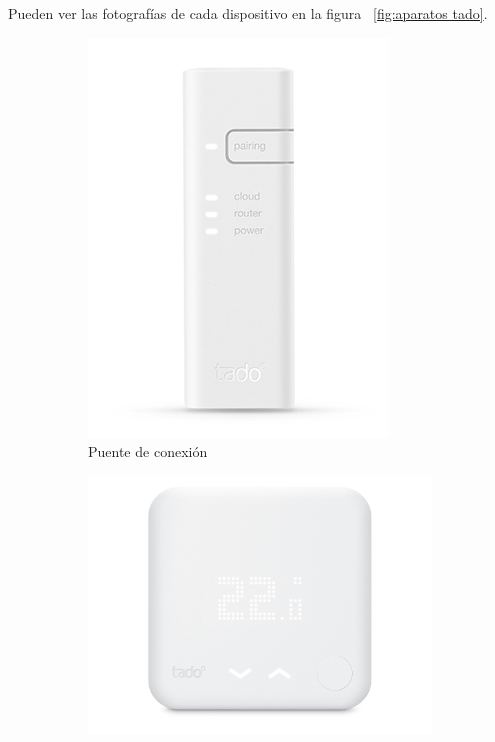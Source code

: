 \documentclass[spanish,12pt, a4paper, twoside]{paper}
\begin{document}
Pueden ver las fotografías de cada dispositivo en la figura ~\ref{fig:aparatos tado}.

\begin{figure}[htp]
\begin{subfigure}{0.5\textwidth}
\includegraphics[width=\textwidth]{recursos/bridge.jpg}
\caption{Puente de conexión}
\label{fig:bridge tado}
\end{subfigure}
\begin{subfigure}{0.5\textwidth}
\includegraphics[width=\textwidth]{recursos/termostato.jpeg}

\end{subfigure}
\end{figure}
\end{document}
